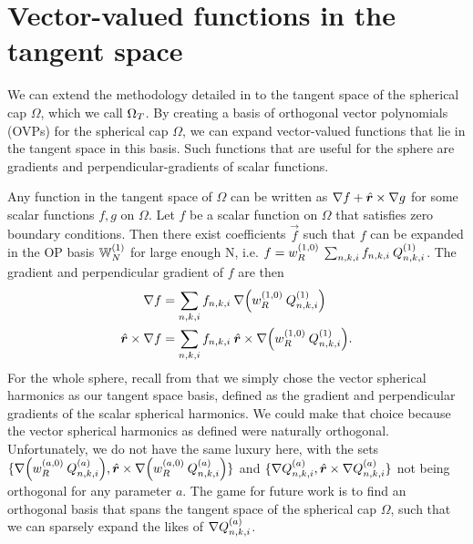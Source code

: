 \appendix


\section{Vector-valued functions in the tangent space}

We can extend the methodology detailed in  to the tangent space of the spherical cap $\Omega$, which we call ${\Omega_T}$. By creating a basis of orthogonal vector polynomials (OVPs) for the spherical cap $\Omega$, we can expand vector-valued functions that lie in the tangent space in this basis. Such functions that are useful for the sphere are gradients and perpendicular-gradients of scalar functions.

Any function in the tangent space of $\Omega$ can be written as $\nabla f + \hat{\bm{r}} \times \nabla g$ for some scalar functions $f, g$ on $\Omega$. Let $f$ be a scalar function on $\Omega$ that satisfies zero boundary conditions. Then there exist coefficients $\vec{f}$ such that $f$ can be expanded in the OP basis $\mathbb{W}_N^{(1)}$ for large enough N, i.e. $f = w_R^{(1,0)} \: \sum_{n,k,i} f_{n,k,i} \: Q_{n,k,i}^{(1)}$. The gradient and perpendicular gradient of $f$ are then
\begin{align*}
	\nabla f &= \sum_{n,k,i} f_{n,k,i} \: \nabla \Big( w_R^{(1,0)} \: Q_{n,k,i}^{(1)} \Big) \\
	\hat{\bm{r}} \times \nabla f &= \sum_{n,k,i} f_{n,k,i} \: \hat{\bm{r}} \times \nabla \Big( w_R^{(1,0)} \: Q_{n,k,i}^{(1)} \Big).
\end{align*}
For the whole sphere, recall from  that we simply chose the vector spherical harmonics as our tangent space basis, defined as the gradient and perpendicular gradients of the scalar spherical harmonics. We could make that choice because the vector spherical harmonics as defined were naturally orthogonal. Unfortunately, we do not have the same luxury here, with the sets $\{ \nabla \Big( w_R^{(a,0)} \: Q_{n,k,i}^{(a)} \Big), \hat{\bm{r}} \times \nabla \Big( w_R^{(a,0)} \: Q_{n,k,i}^{(a)} \Big) \}$ and $\{ \nabla Q_{n,k,i}^{(a)}, \hat{\bm{r}} \times \nabla Q_{n,k,i}^{(a)} \}$ not being orthogonal for any parameter $a$. The game for future work is to find an orthogonal basis that spans the tangent space of the spherical cap $\Omega$, such that we can sparsely expand the likes of $\nabla Q_{n,k,i}^{(a)}$.




